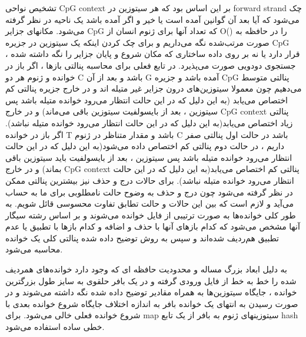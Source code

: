 
تشخیص نواحی CpG context بر این اساس بود که هر سیتوزین در forward strand چک می‌شود که آیا بعد آن گوانین آمده است یا خیر و اگر آمده باشد یک ناحیه در نظر گرفته می‌شود. مکانهای جزایر CpG که تعداد آنها برای ژنوم انسان از O() را در حافظه به صورت مرتب‌شده نگه می‌داریم و برای چک کردن اینکه یک سیتوزین در جزیره CpG قرار دارد یا نه بر روی داده ساختاری که مکان شروع و پایان جزایر را نگه داشته‌ شده ، جستجوی دودویی صورت می‌پذیرد.
در تابع فعلی برای محاسبه پنالتی بازها ، اگر باز در خوانده و ژنوم هر دو C باشد و بعد از آن G آمده باشد و جزیره CpG پنالتی متوسط می‌دهیم چون معمولا سیتوزین‌های درون جزایر غیر متیله اند و در خارج جزیره پنالتی کم اختصاص می‌یابد (به این دلیل که در این حالت انتظار می‌رود خوانده متیله باشد پس سیتوزین ، بعد از بایسولفیت سیتوزین باقی می‌ماند) و در خارج CpG context پنالتی زیاد اختصاص می‌یابد(به این دلیل که در این حالت انتظار می‌رود خوانده متیله نباشد).
اگر باز در خوانده T باشد و مقدار متناظر در ژنوم C باشد در حالت اول پنالتی صفر داریم ، در حالت دوم پنالتی کم اختصاص داده می‌شود(به این دلیل که در این حالت انتظار می‌رود خوانده متیله باشد پس سیتوزین ، بعد از بایسولفیت باید سیتوزین باقی بماند) و در خارج CpG context پنالتی کم اختصاص می‌یابد(به این دلیل که در این حالت انتظار می‌رود خوانده متیله نباشد).
برای حالات درج و حذف نیز بیشترین پنالتی ممکن در نظر گرفته می‌شود چون درج و حذف به وضوح حالت نامطلوبی برای ما به حساب می‌آید و لازم است که بین این حالات و حالت تطابق تفاوت محسوسی قائل شویم.
به طور کلی خوانده‌ها به صورت ترتیبی از فایل خوانده می‌شوند و بر اساس رشته سیگار آنها مشخص می‌شود که کدام بازهای آنها با حذف و اضافه و کدام بازها با تطبیق یا عدم تطبیق هم‌ردیف شده‌اند و سپس به روش توضیح داده شده پنالتی‌ کلی یک خوانده محاسبه می‌شود.


به دلیل ابعاد بزرگ مساله و محدودیت حافظه ای که وجود دارد خوانده‌های همردیف شده را خط به خط از فایل ورودی گرفته و در یک بافر حلقوی به سایز طول بزرگترین خوانده ، جایگاه سیتوزین‌ها به همراه مقادیر توضیح داده شده نگه داشته می‌شوند و در صورت رسیدن به انتهای یک خوانده بافر به اندازه اختلاف جایگاه شروع خوانده بعدی با شروع خوانده فعلی خالی می‌شود. برای map سیتوزینهای ژنوم به بافر از یک تابع hash خطی ساده استفاده می‌شود.